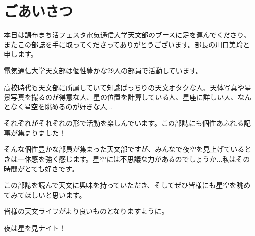 \documentclass[supernova_2023]{subfiles}
\begin{document}
\chapter{ごあいさつ}
\vspace{2\zw}
\begin{center}


  \phantom{a}\par
  本日は調布まち活フェスタ電気通信大学天文部のブースに足を運んでくださり、またこの部誌を手に取ってくださってありがとうございます。部長の川口美玲と申します。
  
  
  \phantom{a}\par
  電気通信大学天文部は個性豊かな29人の部員で活動しています。
  
  
  \phantom{a}\par
  高校時代も天文部に所属していて知識ばっちりの天文オタクな人、天体写真や星景写真を撮るのが得意な人、星の位置を計算している人、星座に詳しい人、なんとなく星空を眺めるのが好きな人...
  
  
  \phantom{a}\par
  それぞれがそれぞれの形で活動を楽しんでいます。この部誌にも個性あふれる記事が集まりました！
  
  
  \phantom{a}\par
  そんな個性豊かな部員が集まった天文部ですが、みんなで夜空を見上げているときは一体感を強く感じます。星空には不思議な力があるのでしょうか...私はその時間がとても好きです。
  
  
  \phantom{a}\par
  この部誌を読んで天文に興味を持っていただき、そしてぜひ皆様にも星空を眺めてみてほしいと思います。
  
  
  \phantom{a}\par
  皆様の天文ライフがより良いものとなりますように。
  
  
  \phantom{a}\par
  夜は星を見ナイト！
  
  
\end{center}
\vspace{5\zw}
\end{document}
